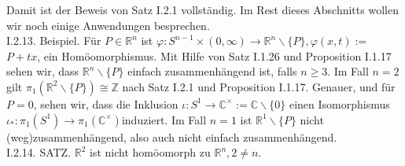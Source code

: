 \documentclass[10pt, letterpaper]{article}
\begin{document}
Damit ist der Beweis von Satz I.2.1 vollständig. Im Rest dieses Abschnitts wollen wir noch einige Anwendungen besprechen.\\
I.2.13. Beispiel. Für $P \in \mathbb{R}^{n}$ ist $\varphi: S^{n-1} \times(0, \infty) \rightarrow \mathbb{R}^{n} \backslash\{P\}, \varphi(x, t):=$ $P+t x$, ein Homöomorphismus. Mit Hilfe von Satz I.1.26 und Proposition I.1.17 sehen wir, dass $\mathbb{R}^{n} \backslash\{P\}$ einfach zusammenhängend ist, falls $n \geq 3$. Im Fall $n=2$ gilt $\pi_{1}\left(\mathbb{R}^{2} \backslash\{P\}\right) \cong \mathbb{Z}$ nach Satz I.2.1 und Proposition I.1.17. Genauer, und für $P=0$, sehen wir, dass die Inklusion $\iota: S^{1} \rightarrow \mathbb{C}^{\times}:=\mathbb{C} \backslash\{0\}$ einen Isomorphismus $\iota_{*}: \pi_{1}\left(S^{1}\right) \rightarrow \pi_{1}\left(\mathbb{C}^{\times}\right)$induziert. Im Fall $n=1$ ist $\mathbb{R}^{1} \backslash\{P\}$ nicht (weg)zusammenhängend, also auch nicht einfach zusammenhängend.\\
I.2.14. SATZ. $\mathbb{R}^{2}$ ist nicht homöomorph zu $\mathbb{R}^{n}, 2 \neq n$.
\end{document}
